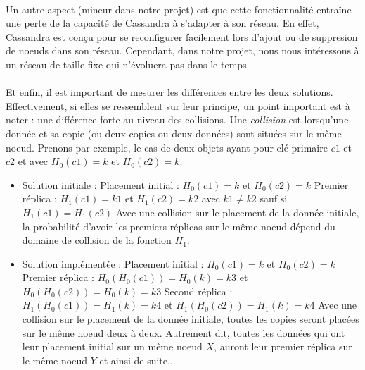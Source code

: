 \documentclass[12pt]{article}
\begin{document}
\paragraph{}Un autre aspect (mineur dans notre projet) est que cette fonctionnalité entraîne une perte de la capacité de Cassandra à s'adapter à son réseau. En effet, Cassandra est conçu pour se reconfigurer facilement lors d'ajout ou de suppresion de noeuds dans son réseau. Cependant, dans notre projet, nous nous intéressons à un réseau de taille fixe qui n'évoluera pas dans le temps.

\paragraph{}Et enfin, il est important de mesurer les différences entre les deux solutions. Effectivement, si elles se ressemblent sur leur principe, un point important est à noter : une différence forte au niveau des collisions. Une \textit{collision} est lorsqu'une donnée et sa copie (ou deux copies ou deux données) sont situées sur le même noeud. \newline
Prenons par exemple, le cas de deux objets ayant pour clé primaire $c1$ et $c2$ et avec $ H_0 (c1) = k $ et $ H_0 (c2) = k $.
\begin{itemize}
    \item \underline{Solution initiale :} \newline
        Placement initial : $ H_0 (c1) = k $ et $ H_0 (c2) = k $ \newline
        Premier réplica : $ H_1 (c1) = k1 $ et $ H_1 (c2) = k2 $ avec $ k1 \neq k2 $ sauf si $ H_1 (c1) = H_1 (c2) $ \newline 
        Avec une collision sur le placement de la donnée initiale, la probabilité d'avoir les premiers réplicas sur le même noeud dépend du domaine de collision de la fonction $ H_1 $.


    \item \underline{Solution implémentée :} \newline
        Placement initial : $ H_0 (c1) = k $ et $ H_0 (c2) = k $ \newline
        Premier réplica : $ H_0 (H_0 (c1)) = H_0(k) = k3 $ et $ H_0 (H_0 (c2)) = H_0(k) = k3 $ \newline
        Second réplica : $ H_1 (H_0 (c1)) = H_1 (k) = k4 $ et $ H_1 (H_0 (c2)) = H_1 (k) = k4 $ \newline
        Avec une collision sur le placement de la donnée initiale, toutes les copies seront placées sur le même noeud deux à deux. \newline
        Autrement dit, toutes les données qui ont leur placement initial sur un même noeud $X$, auront leur premier réplica sur le même noeud $Y$ et ainsi de suite...

\end{itemize}
\end{document}
